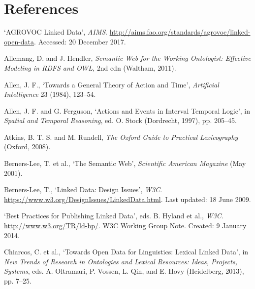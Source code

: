 

\section*{References}

\begin{list}{}%
{\leftmargin=0.5in \itemindent=-0.5in}
\setlength{\itemsep}{0pt}
\setlength{\parskip}{0pt}
\setlength{\parsep}{0pt}

\item %
`AGROVOC Linked Data', \textit{AIMS}. \url{http://aims.fao.org/standards/agrovoc/linked-open-data}. Accessed: 20 December 2017.

\item %
Allemang, D. and J. Hendler, \textit{Semantic Web for the Working Ontologist: Effective Modeling in RDFS and OWL}, 2nd edn (Waltham, 2011).

\item %
Allen, J. F., `Towards a General Theory of Action and Time', \textit{Artificial Intelligence} 23 (1984), 123–54.

\item %
Allen, J. F. and G. Ferguson, `Actions and Events in Interval Temporal Logic', in \textit{Spatial and Temporal Reasoning}, ed. O. Stock (Dordrecht, 1997), pp. 205–45.

\item %
Atkins, B. T. S. and M. Rundell, \textit{The Oxford Guide to Practical Lexicography} (Oxford, 2008).

\item %
Berners-Lee, T. et al., `The Semantic Web', \textit{Scientific American Magazine} (May 2001). 

\item %
Berners-Lee, T., `Linked Data: Design Issues', \textit{W3C}. \url{https://www.w3.org/DesignIssues/LinkedData.html}. Last updated: 18 June 2009.

\item %
`Best Practices for Publishing Linked Data', eds. B. Hyland et al., \textit{W3C}. \url{http://www.w3.org/TR/ld-bp/}. W3C Working Group Note. Created: 9 January 2014.

\item %
Chiarcos, C. et al., `Towards Open Data for Linguistics: Lexical Linked Data', in \textit{New Trends of Research in Ontologies and Lexical Resources: Ideas, Projects, Systems}, eds. A. Oltramari, P. Vossen, L. Qin, and E. Hovy (Heidelberg, 2013), pp. 7–25.


\end{list}
